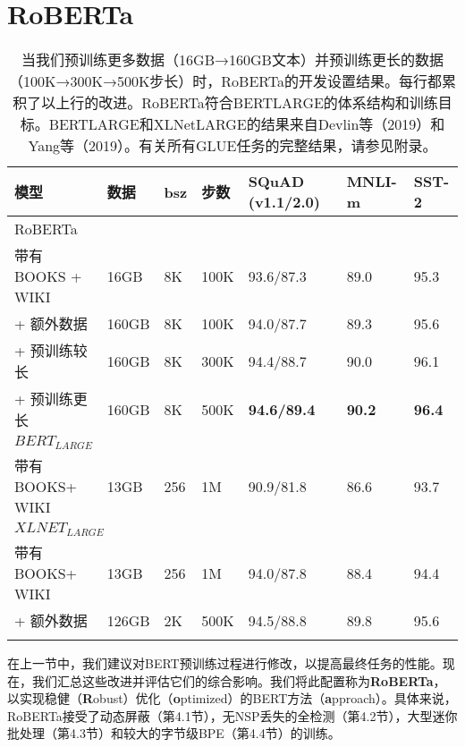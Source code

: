 \documentclass[lang=cn,11pt,a4paper,twocolumn]{elegantpaper}
\begin{document}
\section{RoBERTa}
\begin{table*}[]
  \centering
  \begin{tabular}{lllllll}
  \hline
  \textbf{模型}      & 数据    & \textbf{bsz} & 步数   & \textbf{SQuAD (v1.1/2.0)} & \textbf{MNLI-m} & \textbf{SST-2} \\ \hline
  \multicolumn{7}{l}{RoBERTa}                                                                                   \\
  带有 BOOKS  + WIKI & 16GB  & 8K           & 100K & 93.6/87.3                 & 89.0            & 95.3           \\
  + 额外数据           & 160GB & 8K           & 100K & 94.0/87.7                 & 89.3            & 95.6           \\
  + 预训练较长          & 160GB & 8K           & 300K & 94.4/88.7                 & 90.0            & 96.1           \\
  + 预训练更长          & 160GB & 8K           & 500K & \textbf{94.6/89.4}        & \textbf{90.2}   & \textbf{96.4}  \\ \hline
  \multicolumn{7}{l}{$BERT_{LARGE}$}                                                                            \\
  带有 BOOKS+ WIKI   & 13GB  & 256          & 1M   & 90.9/81.8                 & 86.6            & 93.7           \\
  \multicolumn{7}{l}{$XLNET_{LARGE}$}                                                                           \\
  带有 BOOKS+ WIKI   & 13GB  & 256          & 1M   & 94.0/87.8                 & 88.4            & 94.4           \\
  + 额外数据           & 126GB & 2K           & 500K & 94.5/88.8                 & 89.8            & 95.6           \\ \hline
                   &       &              &      &                           &                 &               
  \end{tabular}
  \caption{当我们预训练更多数据（16GB→160GB文本）并预训练更长的数据（100K→300K→500K步长）时，RoBERTa的开发设置结果。每行都累积了以上行的改进。RoBERTa符合BERTLARGE的体系结构和训练目标。BERTLARGE和XLNetLARGE的结果来自Devlin等（2019）和Yang等（2019）。有关所有GLUE任务的完整结果，请参见附录。}
\end{table*}
在上一节中，我们建议对BERT预训练过程进行修改，以提高最终任务的性能。现在，我们汇总这些改进并评估它们的综合影响。我们将此配置称为\textbf{RoBERTa}，以实现稳健（\textbf{R}obust）优化（\textbf{o}ptimized）的BERT方法（\textbf{a}pproach）。具体来说，RoBERTa接受了动态屏蔽（第4.1节），无NSP丢失的全检测（第4.2节），大型迷你批处理（第4.3节）和较大的字节级BPE（第4.4节）的训练。
\end{document}
